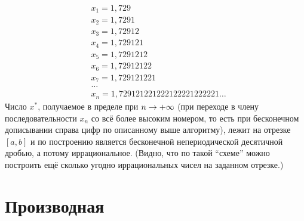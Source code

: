 \documentclass[a4paper,12pt]{article}
\begin{document}
\begin{solution}
\[\begin{aligned}
        &x_1 = 1,729\\
        &x_2 = 1,7291\\
        &x_3 = 1,72912\\
        &x_4 = 1,729121\\
        &x_5 = 1,7291212\\
        &x_6 = 1,72912122\\
        &x_7 = 1,729121221\\
        &\ldots\\
        &x_n = 1,729121221222122221222221\ldots
      \end{aligned}
    \]
    Число $x^*$, получаемое в пределе при $n \hm\to +\infty$ (при переходе в члену последовательности $x_n$ со всё более высоким номером, то есть при бесконечном дописывании справа цифр по описанному выше алгоритму), лежит на отрезке $[a, b]$ и по построению является бесконечной непериодической десятичной дробью, а потому иррациональное.
    (Видно, что по такой ``схеме'' можно построить ещё сколько угодно иррациональных чисел на заданном отрезке.)
  \end{solution}
  
  
  
  
  \section{Производная}
  
\end{document}
